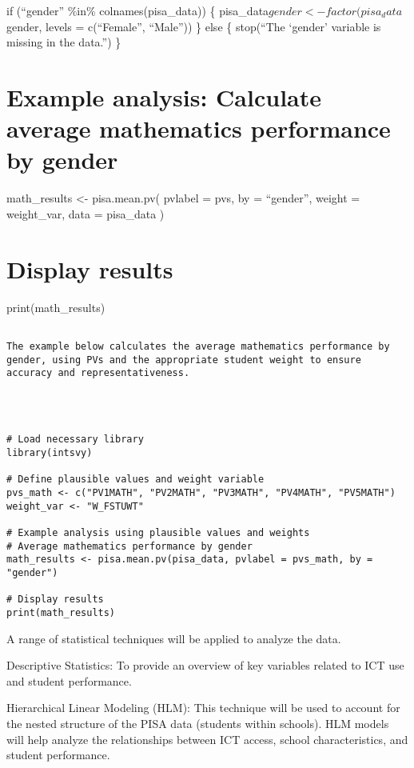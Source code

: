 \documentclass[
]{article}
\begin{document}
if (``gender'' \%in\% colnames(pisa\_data)) \{
pisa\_data\(gender <- factor(pisa_data\)gender, levels = c(``Female'',
``Male'')) \} else \{ stop(``The `gender' variable is missing in the
data.'') \}

\hypertarget{example-analysis-calculate-average-mathematics-performance-by-gender}{%
\section{Example analysis: Calculate average mathematics performance by
gender}\label{example-analysis-calculate-average-mathematics-performance-by-gender}}

math\_results \textless- pisa.mean.pv( pvlabel = pvs, by = ``gender'',
weight = weight\_var, data = pisa\_data )

\hypertarget{display-results}{%
\section{Display results}\label{display-results}}

print(math\_results)

\begin{verbatim}

The example below calculates the average mathematics performance by gender, using PVs and the appropriate student weight to ensure accuracy and representativeness.




# Load necessary library
library(intsvy)

# Define plausible values and weight variable
pvs_math <- c("PV1MATH", "PV2MATH", "PV3MATH", "PV4MATH", "PV5MATH")
weight_var <- "W_FSTUWT"

# Example analysis using plausible values and weights
# Average mathematics performance by gender
math_results <- pisa.mean.pv(pisa_data, pvlabel = pvs_math, by = "gender")

# Display results
print(math_results)
\end{verbatim}

A range of statistical techniques will be applied to analyze the data.

Descriptive Statistics: To provide an overview of key variables related
to ICT use and student performance.

Hierarchical Linear Modeling (HLM): This technique will be used to
account for the nested structure of the PISA data (students within
schools). HLM models will help analyze the relationships between ICT
access, school characteristics, and student performance.
\end{document}
